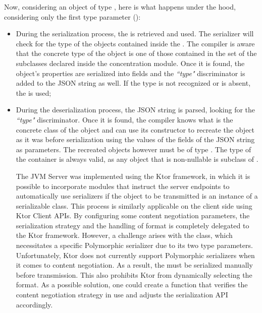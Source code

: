 

Now, considering an object of type , here is what happens under the hood, considering only the first type parameter ():
\begin{itemize}
	\item During the serialization process, the   is retrieved and used. The serializer will check for the type of the  objects contained inside the . The compiler is aware that the concrete type of the object is one of those contained in the set of the subclasses declared inside the concentration module. Once it is found, the object's properties are serialized into fields and the \textit{``type"} discriminator is added to the JSON string as well. If the type is not recognized or is absent, the  is used;
	\item  During the deserialization process, the JSON string is parsed, looking for the \textit{``type"} discriminator. Once it is found, the compiler knows what is the concrete class of the object and can use its constructor to recreate the object as it was before serialization using the values of the fields of the JSON string as parameters. The recreated objects however must be of type . The type of the container is always valid, as any object that is non-nullable is subclass of .
	\begin{warn}
		The JVM Server was implemented using the Ktor framework, in which it is possible to incorporate modules that instruct the server endpoints to automatically use serializers if the object to be transmitted is an instance of a serializable class. This process is similarly applicable on the client side using Ktor Client APIs.
		By configuring some content negotiation parameters, the serialization strategy and the handling of format is completely delegated to the Ktor framework. However, a challenge arises with the  class, which necessitates a specific Polymorphic serializer due to its two type parameters. Unfortunately, Ktor does not currently support Polymorphic serializers when it comes to content negotiation. As a result, the  must be serialized manually before transmission. This also prohibits Ktor from dynamically selecting the format. As a possible solution, one could create a function that verifies the content negotiation strategy in use and adjusts the  serialization API accordingly.
	\end{warn}
\end{itemize}
